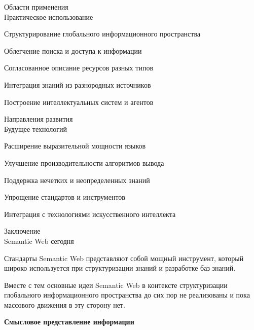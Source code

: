 \begin{frame}{Области применения\\Практическое использование}
	\topline
	\justifying
	\begin{textitemize}
		\item Структурирование глобального информационного пространства
		\item Облегчение поиска и доступа к информации
		\item Согласованное описание ресурсов разных типов
		\item Интеграция знаний из разнородных источников
		\item Построение интеллектуальных систем и агентов
	\end{textitemize}
\end{frame}

\begin{frame}{Направления развития\\Будущее технологий}
	\topline
	\justifying
	\begin{textitemize}
		\item Расширение выразительной мощности языков
		\item Улучшение производительности алгоритмов вывода
		\item Поддержка нечетких и неопределенных знаний
		\item Упрощение стандартов и инструментов
		\item Интеграция с технологиями искусственного интеллекта
	\end{textitemize}
\end{frame}

\begin{frame}{Заключение\\Semantic Web сегодня}
	\topline
	\justifying
	
	Стандарты Semantic Web представляют собой мощный инструмент, который широко используется при структуризации знаний и разработке баз знаний.
	
	\bigskip
	
	Вместе с тем основные идеи Semantic Web в контексте структуризации глобального информационного пространства до сих пор не реализованы и пока массового движения в эту сторону нет.
	
\end{frame}

\begin{frame}{}
	
	\centering
	
	\Huge
	
	\textbf{Смысловое представление информации}
	
\end{frame}



